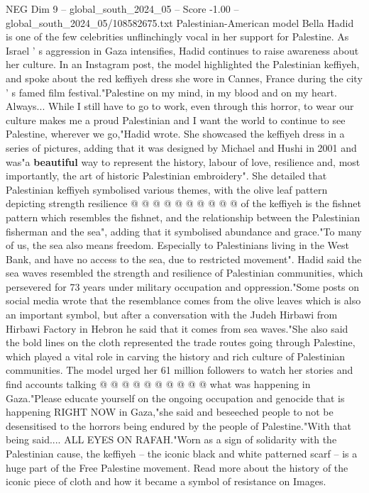 \begin{textsample}{NEG Dim 9 – global\_south\_2024\_05 – Score -1.00 – global\_south\_2024\_05/108582675.txt}  \label{ex:f9_neg_335}
Palestinian-American model Bella Hadid is one of the few celebrities unflinchingly vocal in her support for Palestine.
As Israel ' s aggression in Gaza intensifies, Hadid continues to raise awareness about her culture.
In an Instagram post, the model highlighted the Palestinian keffiyeh, and spoke about the red keffiyeh dress she wore in Cannes, France during the city ' s famed film festival."Palestine on my mind, in my blood and on my heart.
Always...
While I still have to go to work, even through this horror, to wear our culture makes me a proud Palestinian and I want the world to continue to see Palestine, wherever we go,"Hadid wrote.
She showcased the keffiyeh dress in a series of pictures, adding that it was designed by Michael and Hushi in 2001 and was"a \textbf{beautiful} way to represent the history, labour of love, resilience and, most importantly, the art of historic Palestinian embroidery".
She detailed that Palestinian keffiyeh symbolised various themes, with the olive leaf pattern depicting strength resilience @ @ @ @ @ @ @ @ @ @ of the keffiyeh is the fishnet pattern which resembles the fishnet, and the relationship between the Palestinian fisherman and the sea", adding that it symbolised abundance and grace."To many of us, the sea also means freedom.
Especially to Palestinians living in the West Bank, and have no access to the sea, due to restricted movement".
Hadid said the sea waves resembled the strength and resilience of Palestinian communities, which persevered for 73 years under military occupation and oppression."Some posts on social media wrote that the resemblance comes from the olive leaves which is also an important symbol, but after a conversation with the Judeh Hirbawi from Hirbawi Factory in Hebron he said that it comes from sea waves."She also said the bold lines on the cloth represented the trade routes going through Palestine, which played a vital role in carving the history and rich culture of Palestinian communities.
The model urged her 61 million followers to watch her stories and find accounts talking @ @ @ @ @ @ @ @ @ @ what was happening in Gaza."Please educate yourself on the ongoing occupation and genocide that is happening RIGHT NOW in Gaza,"she said and beseeched people to not be desensitised to the horrors being endured by the people of Palestine."With that being said....
ALL EYES ON RAFAH."Worn as a sign of solidarity with the Palestinian cause, the keffiyeh -- the iconic black and white patterned scarf -- is a huge part of the Free Palestine movement.
Read more about the history of the iconic piece of cloth and how it became a symbol of resistance on Images.

\end{textsample}
